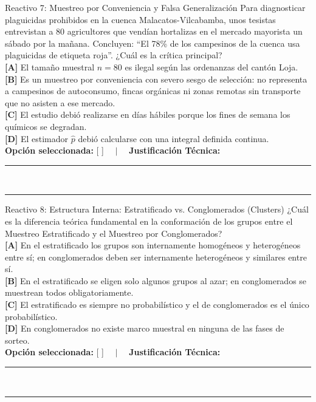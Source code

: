 \documentclass[11pt,a4paper]{article}
\begin{document}
\begin{reactivobox}{Reactivo 7: Muestreo por Conveniencia y Falsa Generalización}
Para diagnosticar plaguicidas prohibidos en la cuenca Malacatos-Vilcabamba, unos tesistas entrevistan a 80 agricultores que vendían hortalizas en el mercado mayorista un sábado por la mañana. Concluyen: ``El 78\% de los campesinos de la cuenca usa plaguicidas de etiqueta roja''. ¿Cuál es la crítica principal?\\
\textbf{[A]} El tamaño muestral $n = 80$ es ilegal según las ordenanzas del cantón Loja.\\
\textbf{[B]} Es un muestreo por conveniencia con severo sesgo de selección: no representa a campesinos de autoconsumo, fincas orgánicas ni zonas remotas sin transporte que no asisten a ese mercado.\\
\textbf{[C]} El estudio debió realizarse en días hábiles porque los fines de semana los químicos se degradan.\\
\textbf{[D]} El estimador $\hat{p}$ debió calcularse con una integral definida continua.\\[4pt]
\textbf{Opción seleccionada:} [ \quad ] $\quad \vert \quad$ \textbf{Justificación Técnica:}\\
\rule{\linewidth}{0.4pt}\\[2pt]
\rule{\linewidth}{0.4pt}
\end{reactivobox}

\begin{reactivobox}{Reactivo 8: Estructura Interna: Estratificado vs. Conglomerados (Clusters)}
¿Cuál es la diferencia teórica fundamental en la conformación de los grupos entre el Muestreo Estratificado y el Muestreo por Conglomerados?\\
\textbf{[A]} En el estratificado los grupos son internamente homogéneos y heterogéneos entre sí; en conglomerados deben ser internamente heterogéneos y similares entre sí.\\
\textbf{[B]} En el estratificado se eligen solo algunos grupos al azar; en conglomerados se muestrean todos obligatoriamente.\\
\textbf{[C]} El estratificado es siempre no probabilístico y el de conglomerados es el único probabilístico.\\
\textbf{[D]} En conglomerados no existe marco muestral en ninguna de las fases de sorteo.\\[4pt]
\textbf{Opción seleccionada:} [ \quad ] $\quad \vert \quad$ \textbf{Justificación Técnica:}\\
\rule{\linewidth}{0.4pt}\\[2pt]
\rule{\linewidth}{0.4pt}
\end{reactivobox}
\end{document}
